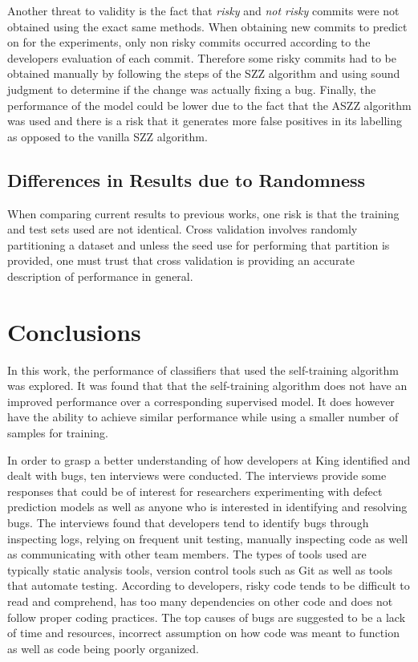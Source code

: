 \documentclass[../main.tex]{subfiles}
\begin{document}
Another threat to validity is the fact that \textit{risky} and \textit{not risky} commits were not obtained using the exact same methods. When obtaining new commits to predict on for the experiments, only non risky commits occurred according to the developers evaluation of each commit. Therefore some risky commits had to be obtained manually by following the steps of the SZZ algorithm and using sound judgment to determine if the change was actually fixing a bug. Finally, the performance of the model could be lower due to the fact that the ASZZ algorithm was used and there is a risk that it generates more false positives in its labelling as opposed to the vanilla SZZ algorithm.

\subsection{Differences in Results due to Randomness}

When comparing current results to previous works, one risk is that the training and test sets used are not identical. Cross validation involves randomly partitioning a dataset and unless the seed use for performing that partition is provided, one must trust that cross validation is providing an accurate description of performance in general. 

\section{Conclusions}

In this work, the performance of classifiers that used the self-training algorithm was explored. It was found that that the self-training algorithm does not have an improved performance over a corresponding supervised model. It does however have the ability to achieve similar performance while using a smaller number of samples for training. 

In order to grasp a better understanding of how developers at King identified and dealt with bugs, ten interviews were conducted. The interviews provide some responses that could be of interest for researchers experimenting with defect prediction models as well as anyone who is interested in identifying and resolving bugs. The interviews found that developers tend to identify bugs through inspecting logs, relying on frequent unit testing, manually inspecting code as well as communicating with other team members. The types of tools used are typically static analysis tools, version control tools such as Git as well as tools that automate testing. According to developers, risky code tends to be difficult to read and comprehend, has too many dependencies on other code and does not follow proper coding practices. The top causes of bugs are suggested to be a lack of time and resources, incorrect assumption on how code was meant to function as well as code being poorly organized. 
\end{document}
